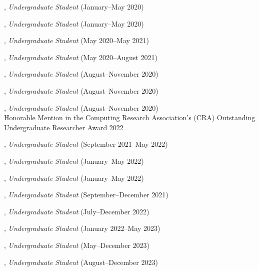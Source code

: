\documentclass[10pt]{article}
\newenvironment{myindentpar}[1]%
{\begin{list}{}%
         {\setlength{\leftmargin}{#1}}%
         \item[]%
}
{\end{list}}
\newcounter{list}
\begin{document}
\begin{myindentpar}{0.75cm}
\hspace{-0.75cm}{\bf Alvin Alaphat}, \textit{Undergraduate Student} (January--May 2020)

\hspace{-0.75cm}{\bf Luke Marushack}, \textit{Undergraduate Student} (January--May 2020)

\hspace{-0.75cm}{\bf Michael Lee}, \textit{Undergraduate Student} (May 2020--May 2021)

\hspace{-0.75cm}{\bf Ann Hermann}, \textit{Undergraduate Student} (May 2020--August 2021)

\hspace{-0.75cm}{\bf Joseph Kuebler}, \textit{Undergraduate Student} (August--November 2020)

\hspace{-0.75cm}{\bf Facundo Munoz}, \textit{Undergraduate Student} (August--November 2020)

\hspace{-0.75cm}{\bf Fangcong Yin}, \textit{Undergraduate Student} (August--November 2020) \\
	Honorable Mention in the Computing Research Association's (CRA) Outstanding Undergraduate Researcher Award 2022

\hspace{-0.75cm}{\bf Jackson Ballow}, \textit{Undergraduate Student} (September 2021--May 2022)

\hspace{-0.75cm}{\bf Ryan Pairitz}, \textit{Undergraduate Student} (January--May 2022)

\hspace{-0.75cm}{\bf Kekoa Wang}, \textit{Undergraduate Student} (January--May 2022)

\hspace{-0.75cm}{\bf Longqing Chen}, \textit{Undergraduate Student} (September--December 2021)

\hspace{-0.75cm}{\bf William Porter}, \textit{Undergraduate Student} (July--December 2022)

\hspace{-0.75cm}{\bf Weike Fang}, \textit{Undergraduate Student} (January 2022--May 2023)

\hspace{-0.75cm}{\bf David Liu}, \textit{Undergraduate Student} (May--December 2023)

\hspace{-0.75cm}{\bf John Flanagan}, \textit{Undergraduate Student} (August--December 2023)


\end{myindentpar}
\end{document}
